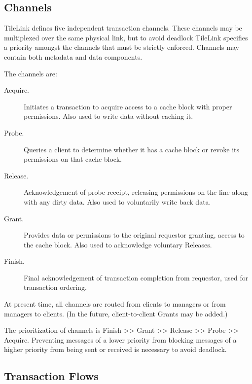 \subsection{Channels}

TileLink defines five independent transaction channels.
These channels may be multiplexed over the same physical link, but to avoid deadlock TileLink specifies a priority amongst the channels that must be strictly enforced.
Channels may contain both metadata and data components.

The channels are:
\begin{description}
\item[Acquire.] Initiates a transaction to acquire access to a cache block with proper permissions. Also used to write data without caching it.
\item[Probe.] Queries a client to determine whether it has a cache block or revoke its permissions on that cache block.
\item[Release.] Acknowledgement of probe receipt, releasing permissions on the line along with any dirty data. Also used to voluntarily write back data.
\item[Grant.] Provides data or permissions to the original requestor granting, access to the cache block. Also used to acknowledge voluntary Releases.
\item[Finish.] Final acknowledgement of transaction completion from requestor, used for transaction ordering.
\end{description}

At present time, all channels are routed from clients to managers or from managers to clients. (In the future, client-to-client Grants may be added.)

The prioritization of channels is Finish >> Grant >> Release >> Probe >> Acquire.
Preventing messages of a lower priority from blocking messages of a higher priority from being sent or received is necessary to avoid deadlock.

\subsection{Transaction Flows}

